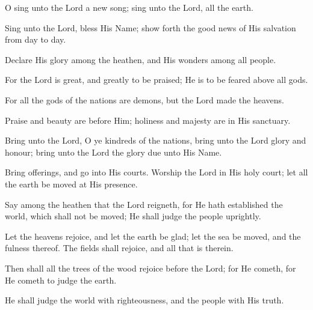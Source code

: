 O sing unto the Lord a new song; sing unto the Lord, all the earth.

Sing unto the Lord, bless His Name; show forth the good news of His salvation from day to day.

Declare His glory among the heathen, and His wonders among all people.

For the Lord is great, and greatly to be praised; He is to be feared above all gods.

For all the gods of the nations are demons, but the Lord made the heavens.

Praise and beauty are before Him; holiness and majesty are in His sanctuary.

Bring unto the Lord, O ye kindreds of the nations, bring unto the Lord glory and honour; bring unto the Lord the glory due unto His Name.

Bring offerings, and go into His courts. Worship the Lord in His holy court; let all the earth be moved at His presence.

Say among the heathen that the Lord reigneth, for He hath established the world, which shall not be moved; He shall judge the people uprightly.

Let the heavens rejoice, and let the earth be glad; let the sea be moved, and the fulness thereof. The fields shall rejoice, and all that is therein.

Then shall all the trees of the wood rejoice before the Lord; for He cometh, for He cometh to judge the earth.

He shall judge the world with righteousness, and the people with His truth.
